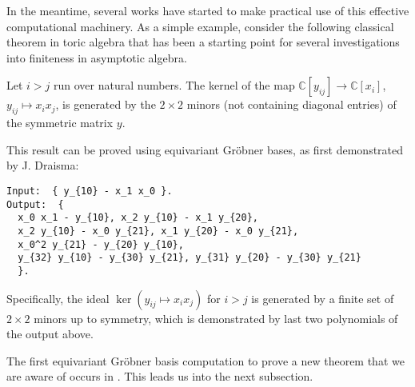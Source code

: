 In the meantime, several works have started to make practical use of this effective computational machinery.  As a simple example, consider 
the following classical theorem in toric algebra that has been a starting point for several investigations into finiteness in asymptotic algebra.

\begin{theorem}\label{toric2x2}
Let $i > j$ run over natural numbers.  The kernel of the map $\mathbb C[y_{ij}] \to \mathbb C[x_i]$, $y_{ij} \mapsto x_i x_j$, is generated by the $2 \times 2$ minors (not containing diagonal entries) of the symmetric matrix $y$.
\end{theorem}

This result can be proved using equivariant Gr\"obner bases, as first demonstrated by J. Draisma:
\begin{verbatim}
Input:  { y_{10} - x_1 x_0 }.
Output:  { 
  x_0 x_1 - y_{10}, x_2 y_{10} - x_1 y_{20}, 
  x_2 y_{10} - x_0 y_{21}, x_1 y_{20} - x_0 y_{21}, 
  x_0^2 y_{21} - y_{20} y_{10},  
  y_{32} y_{10} - y_{30} y_{21}, y_{31} y_{20} - y_{30} y_{21} 
  }.
\end{verbatim}
Specifically, the ideal $\ker{(y_{ij} \mapsto x_i x_j)}$ for $i > j$ is generated by a finite set of $2 \times 2$ minors up to symmetry, 
which is demonstrated by last two polynomials of the output above.

The first equivariant Gr\"obner basis computation to prove a new theorem that we are aware of occurs in \cite{Brouwer09e}. This leads us into the next subsection. 
